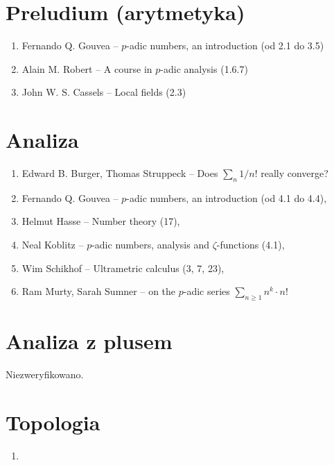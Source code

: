 \section{Preludium (arytmetyka)}
\begin{enumerate}
	\item Fernando Q. Gouvea -- $p$-adic numbers, an introduction (od 2.1 do 3.5)
	\item Alain M. Robert -- A course in $p$-adic analysis (1.6.7)
	\item John W. S. Cassels -- Local fields (2.3)
\end{enumerate}

\section{Analiza}
\begin{enumerate}
	\item Edward B. Burger, Thomas Struppeck -- Does $\sum_n 1/n!$ really converge? 
	\item Fernando Q. Gouvea -- $p$-adic numbers, an introduction (od 4.1 do 4.4),
	\item Helmut Hasse -- Number theory (17),
	\item Neal Koblitz -- $p$-adic numbers, analysis and $\zeta$-functions (4.1),
	\item Wim Schikhof -- Ultrametric calculus (3, 7, 23), 
	\item Ram Murty, Sarah Sumner -- on the $p$-adic series $\sum_{n \ge 1} n^k \cdot n!$
\end{enumerate}

\section{Analiza z plusem}
Niezweryfikowano.

\section{Topologia}
\begin{enumerate}
	\item \end{enumerate}

